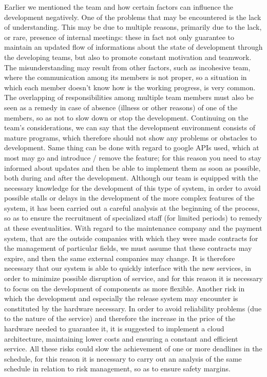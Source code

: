 \documentclass[10pt, a4paper,titlepage]{article}
\begin{document}
Earlier we mentioned the team and how certain factors can influence the development negatively.
One of the problems that may be encountered is the lack of understanding. This may be due to multiple reasons, primarily due to the lack, or rare, presence of internal meetings: these in fact not only guarantee to maintain an updated flow of informations about the state of development through the developing teams, but also to promote constant motivation and teamwork.
The misunderstanding may result from other factors, such as incohesive team, where the communication among its members is not proper, so a situation in which each member doesn’t know how is the working progress, is very common.
The overlapping of responsibilities among multiple team members must also be seen as a remedy in case of absence (illness or other reasons) of one of the members, so as not to slow down or stop the development.
Continuing on the team's considerations, we can say that the development environment consists of mature programs, which therefore should not show any problems or obstacles to development. Same thing can be done with regard to google APIs used, which at most may go and introduce / remove the feature; for this reason you need to stay informed about updates and then be able to implement them as soon as possible, both during and after the development.
Although our team is equipped with the necessary knowledge for the development of this type of system, in order to avoid possible stalls or delays in the development of the more complex features of the system, it has been carried out a careful analysis at the beginning of the process, so as to ensure the recruitment of specialized staff (for limited periods) to remedy at these eventualities.
With regard to the maintenance company and the payment system, that are the outside companies with which they were made contracts for the management of particular fields, we must assume that these contracts may expire, and then the same external companies may change. It is therefore necessary that our system is able to quickly interface with the new services, in order to minimize possible disruption of service, and for this reason it is necessary to focus on the development of components as more flexible.
Another risk in which the development and especially the release system may encounter is constituted by the hardware necessary. In order to avoid reliability problems (due to the nature of the service) and therefore the  increase in the price of the hardware needed to guarantee it, it is suggested to implement a cloud architecture, maintaining lower costs and ensuring a constant and efficient service.
All these risks could slow the achievement of one or more deadlines in the schedule, for this reason it is necessary to carry out an analysis of the same schedule in relation to risk management, so as to ensure safety margins.
\end{document}
